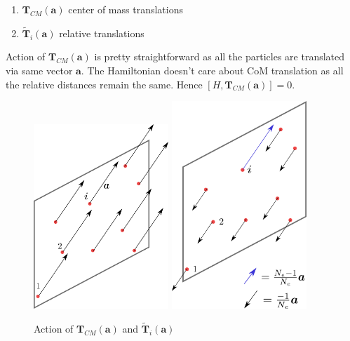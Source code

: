 \documentclass[11pt,a4paper,notitlepage]{article}
\newcommand{\bsym}{\boldsymbol}
\newcommand{\tcm}[1]{\bsym{T}_{CM}(\bsym{#1})}
\newcommand{\trel}[2]{\tilde{\bsym{T}}_{#1}(\bsym{#2})}
\begin{document}
                \begin{enumerate}
                \item  $\tcm{a}$ center of mass translations 
                \item $\trel{i}{a}$ relative translations  
                \end{enumerate}

                Action of $\tcm{a}$ is pretty straightforward as all the particles are translated via same vector $\bsym{a}$. The Hamiltonian doesn't care about CoM translation as all the relative distances remain the same. Hence $[H,\tcm{a}]=0$.

                \pagebreak

                \begin{figure}[h]
                  \centering
                  \includegraphics[width=2in]{figures/pngs/t_cm.png}
                  \hspace{1cm}
                  \includegraphics[width=2in]{figures/pngs/t_rel.png}
                  \caption{Action of $\tcm{a}$ and $\trel{i}{a}$}
                \end{figure}
\end{document}
